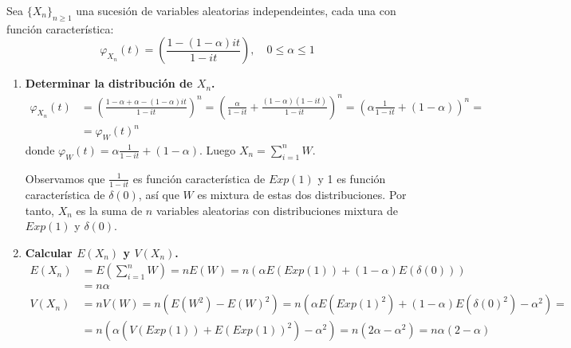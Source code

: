 \begin{exercise}
    Sea $\{X_n\}_{n \geq 1}$ una sucesión de variables aleatorias independeintes, cada una con función característica:
    $$\varphi_{X_n}(t) = \left(\frac{1 - (1-\alpha)it}{1-it}\right), \quad 0 \leq \alpha \leq 1$$

    \begin{enumerate}
        \item \textbf{Determinar la distribución de $X_n$.}
              \begin{align*}
                  \varphi_{X_n}(t) & = \left(\frac{1 - \alpha + \alpha - (1-\alpha)it}{1-it}\right)^n = \left(\frac{\alpha}{1-it} + \frac{(1-\alpha)(1-it)}{1-it}\right)^n = \left(\alpha\frac{1}{1-it} + (1-\alpha)\right)^n = \\
                                   & = \varphi_W(t)^n
              \end{align*}
              donde $\varphi_W(t) = \alpha\frac{1}{1-it} + (1-\alpha)$.
              Luego $X_n = \sum_{i=1}^n W$.

              Observamos que $\frac{1}{1-it}$ es función característica de $Exp(1)$ y 1 es función característica de $\delta(0)$, así que $W$ es mixtura de estas dos distribuciones.
              Por tanto, $X_n$ es la suma de $n$ variables aleatorias con distribuciones mixtura de $Exp(1)$ y $\delta(0)$.
        \item \textbf{Calcular $E(X_n)$ y $V(X_n)$.}
              \begin{align*}
                  E(X_n) & = E\left(\sum_{i=1}^n W\right) = nE(W) = n(\alpha E(Exp(1)) + (1-\alpha)E(\delta(0)))        \\
                         & = n\alpha                                                                                    \\
                  V(X_n) & = nV(W) = n(E(W^2) - E(W)^2) = n(\alpha E(Exp(1)^2) + (1-\alpha)E(\delta(0)^2) - \alpha^2) = \\
                         & = n(\alpha(V(Exp(1)) + E(Exp(1))^2) - \alpha^2) = n(2\alpha - \alpha^2) = n\alpha(2-\alpha)
              \end{align*}


\end{enumerate}
\end{exercise}
